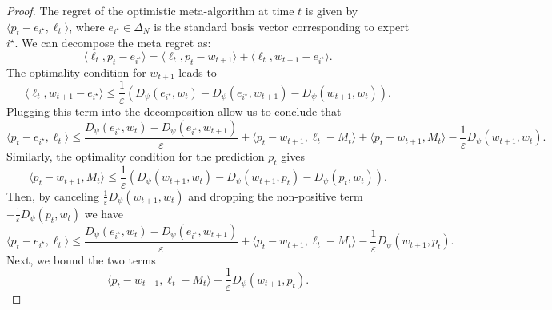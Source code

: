 \documentclass[journal,onecolumn]{IEEEtran}
\theoremstyle{plain}
\theoremstyle{definition}
\theoremstyle{remark}
\begin{document}
{\begin{proof}
    The regret of the optimistic meta-algorithm at time $t$ is given by $\langle p_{t} - e_{i^\star},\ell_{t} \rangle$, where $e_{i^\star} \in \Delta_{N}$ is the standard basis vector corresponding to expert $i^\star$. We can decompose the meta regret as:  
    \begin{equation*}
        \langle \ell_{t}, p_{t} - e_{i^\star} \rangle = \langle \ell_{t}, p_{t} - w_{t+1}\rangle + \langle \ell_{t}, w_{t+1}- e_{i^\star} \rangle.
    \end{equation*} 
    The optimality condition for $w_{t+1}$ leads to 
    \begin{equation*}
        \langle \ell_{t}, w_{t+1}- e_{i^\star} \rangle \le \frac{1}{\varepsilon}(D_{\psi}(e_{i^\star}, w_{t}) - D_{\psi}(e_{i^\star}, w_{t+1}) - D_{\psi}(w_{t+1}, w_{t})).
    \end{equation*} 
    Plugging this term into the decomposition allow us to conclude that
    \begin{equation*}
        \langle p_{t} - e_{i^\star}, \ell_{t} \rangle \le \frac{D_{\psi}(e_{i^\star}, w_{t}) - D_{\psi}(e_{i^\star},
        w_{t+1})}{\varepsilon}+ \langle p_{t} - w_{t+1}, \ell_{t} - M_{t} \rangle
        + \langle p_{t} - w_{t+1}, M_{t} \rangle - \frac{1}{\varepsilon}D_{\psi}(
        w_{t+1}, w_{t}).
    \end{equation*}
    Similarly, the optimality condition for the prediction $p_{t}$ gives 
    \begin{equation*}
        \langle p_{t} - w_{t+1}, M_{t} \rangle \le \frac{1}{\varepsilon}(D_{\psi}(w_{t+1}, w_{t}) - D
    _{\psi}(w_{t+1}, p_{t}) - D_{\psi}(p_{t}, w_{t})).
    \end{equation*}
    Then, by canceling $\frac{1}{\varepsilon}D_{\psi}(w_{t+1}, w_{t})$ and dropping the non-positive term $-\frac{1}{\varepsilon}D_{\psi}(p_{t}, w_{t})$ we have
    \begin{equation*}
        \langle p_{t} - e_{i^\star}, \ell_{t} \rangle \le \frac{D_{\psi}(e_{i^\star}, w_{t}) - D_{\psi}(e_{i^\star},
        w_{t+1})}{\varepsilon}+ \langle p_{t} - w_{t+1}, \ell_{t} - M_{t} \rangle
        - \frac{1}{\varepsilon}D_{\psi}(w_{t+1}, p_{t}).
    \end{equation*}
    Next, we bound the two terms   
    \begin{equation*}
    \langle p_{t} - w_{t+1}, \ell_{t} - M_{t} \rangle - \frac{1}{\varepsilon}D_{\psi}(w_{t+1}, p_{t}).
    \end{equation*}


\end{proof}}
\end{document}
